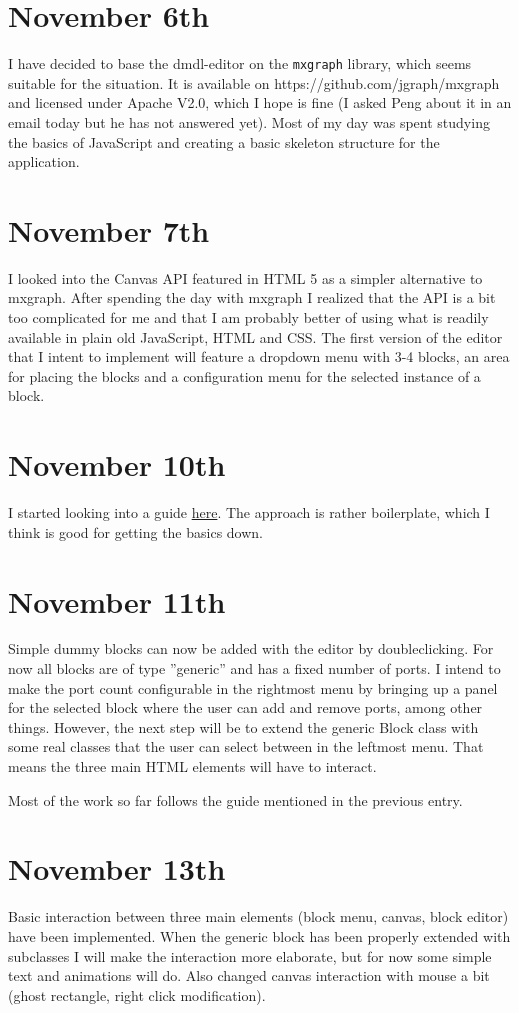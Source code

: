 \documentclass{article}
\begin{document}
\section{November 6th}
I have decided to base the dmdl-editor on the \texttt{mxgraph} library, which seems suitable for the situation.
It is available on https://github.com/jgraph/mxgraph and licensed under Apache V2.0, which I hope is fine (I asked
Peng about it in an email today but he has not answered yet). Most of my day was spent studying the basics of 
JavaScript and creating a basic skeleton structure for the application.

\section{November 7th}
I looked into the Canvas API featured in HTML 5 as a simpler alternative to mxgraph. After spending the day with mxgraph
I realized that the API is a bit too complicated for me and that I am probably better of using what is readily available in
plain old JavaScript, HTML and CSS. The first version of the editor that I intent to implement will feature a dropdown menu
with 3-4 blocks, an area for placing the blocks and a configuration menu for the selected instance of a block.

\section{November 10th}
I started looking into a guide \href{https://simonsarris.com/making-html5-canvas-useful/}{here}.
The approach is rather boilerplate, which I think is good for getting the basics down.

\section{November 11th}
Simple dummy blocks can now be added with the editor by doubleclicking. For now
all blocks are of type ''generic'' and has a fixed number of ports. I intend to make the port
count configurable in the rightmost menu by bringing up a panel for the selected block where
the user can add and remove ports, among other things. However, the next step will be
to extend the generic Block class with some real classes that the user can select
between in the leftmost menu. That means the three main HTML elements will have to interact.

Most of the work so far follows the guide mentioned in the previous entry.

\section{November 13th}
Basic interaction between three main elements (block menu, canvas, block editor) have been
implemented. When the generic block has been properly extended with subclasses I will
make the interaction more elaborate, but for now some simple text and animations will do.
Also changed canvas interaction with mouse a bit (ghost rectangle, right click modification).
\end{document}
